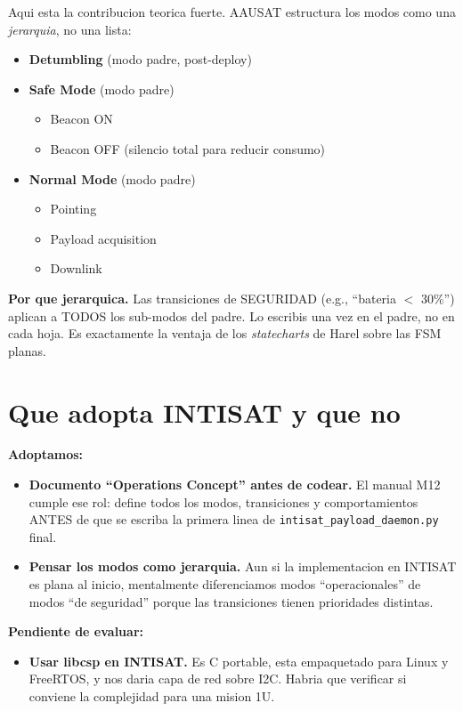 \documentclass[11pt,a4paper,oneside,openright]{book}
\begin{document}
Aqui esta la contribucion teorica fuerte. AAUSAT estructura los modos
como una \emph{jerarquia}, no una lista:

\begin{itemize}[leftmargin=2em]
  \item \textbf{Detumbling} (modo padre, post-deploy)
  \item \textbf{Safe Mode} (modo padre)
    \begin{itemize}
      \item Beacon ON
      \item Beacon OFF (silencio total para reducir consumo)
    \end{itemize}
  \item \textbf{Normal Mode} (modo padre)
    \begin{itemize}
      \item Pointing
      \item Payload acquisition
      \item Downlink
    \end{itemize}
\end{itemize}

\textbf{Por que jerarquica.} Las transiciones de SEGURIDAD (e.g.,
``bateria $<$ 30\%'') aplican a TODOS los sub-modos del padre. Lo
escribis una vez en el padre, no en cada hoja. Es exactamente la
ventaja de los \emph{statecharts} de Harel sobre las FSM planas.

\section{Que adopta INTISAT y que no}

\begin{logrado}
\textbf{Adoptamos:}
\begin{itemize}[leftmargin=2em]
  \item \textbf{Documento ``Operations Concept'' antes de codear.}
    El manual M12 cumple ese rol: define todos los modos, transiciones
    y comportamientos ANTES de que se escriba la primera linea de
    \texttt{intisat\_payload\_daemon.py} final.
  \item \textbf{Pensar los modos como jerarquia.} Aun si la
    implementacion en INTISAT es plana al inicio, mentalmente
    diferenciamos modos ``operacionales'' de modos ``de seguridad''
    porque las transiciones tienen prioridades distintas.
\end{itemize}

\textbf{Pendiente de evaluar:}
\begin{itemize}[leftmargin=2em]
  \item \textbf{Usar libcsp en INTISAT.} Es C portable, esta empaquetado
    para Linux y FreeRTOS, y nos daria capa de red sobre I2C. Habria
    que verificar si conviene la complejidad para una mision 1U.
\end{itemize}
\end{logrado}
\end{document}
